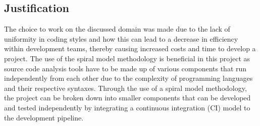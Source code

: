 \subsection{Justification}
The choice to work on the discussed domain was made due to the lack of uniformity in coding styles and how this can lead to a decrease in efficiency within development teams, thereby causing increased costs and time to develop a project. The use of the spiral model methodology is beneficial in this project as source code analysis tools have to be made up of various components that run independently from each other due to the complexity of programming languages and their respective syntaxes. Through the use of a spiral model methodology, the project can be broken down into smaller components that can be developed and tested independently by integrating a continuous integration (CI) model to the development pipeline.
